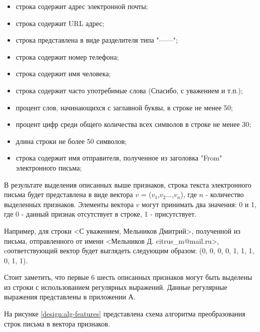 \begin{itemize}
	\item строка содержит адрес электронной почты;
	\item строка содержит URL адрес;
	\item строка представлена в виде разделителя типа "------";
	\item строка содержит номер телефона;
	\item строка содержит имя человека;
	\item строка содержит часто употребимые слова (Спасибо, с уважением и т.п.);
	\item процент слов, начинающихся с заглавной буквы, в строке не менее 50; 
	\item процент цифр среди общего количества всех символов в строке не менее 30;
	\item длина строки не более 50 символов;
	\item строка содержит имя отправителя, полученное из заголовка "From" электронного письма;
\end{itemize}

В результате выделения описанных выше признаков, строка текста электронного письма будет представлена в виде вектора $v$ = ($v_1$,$v_2$...,$v_n$), где $n$ - количество выделенных признаков. Элементы вектора $v$ могут принимать два значения: 0 и 1, где 0 - данный признак отсутствует в строке, 1 - присутствует. 

Например, для строки <С уважением, Мельников Дмитрий>, полученной из письма, отправленного от имени <Мельников Д. citrus\_m@mail.ru>, cоответствующий вектор будет выглядеть следующим образом: (0, 0, 0, 0, 1, 1, 1, 0, 1, 1).

Стоит заметить, что первые 6 шесть описанных признаков могут быть выделены из строки с использованием регулярных выражений.
Данные регулярные выражения представлены в приложении А.

На рисунке \ref{design:alg-features} представлена схема алгоритма преобразования строк письма в вектора признаков.


